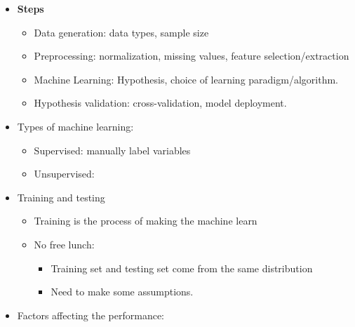\documentclass[
]{book}
\providecommand{\tightlist}{%
  \setlength{\itemsep}{0pt}\setlength{\parskip}{0pt}}
\begin{document}
\begin{itemize}
  \begin{itemize}
  \tightlist
  \item
    Retail: Market basket analysis, customer relationship management (CRM)
  \item
    Finance: Credit scoring, fraud detection.
  \item
    Manufacturing: Optimization, troubleshooting
  \item
    Medicine: medical diagnosis
  \item
    Telecommunications: Quality of service optimization, routing
  \item
    Bioinformatics: Motifs, alignment WEb mining, search engines.
  \end{itemize}
\item
  \textbf{Steps}

  \begin{itemize}
  \tightlist
  \item
    Data generation: data types, sample size
  \item
    Preprocessing: normalization, missing values, feature selection/extraction
  \item
    Machine Learning: Hypothesis, choice of learning paradigm/algorithm.
  \item
    Hypothesis validation: cross-validation, model deployment.
  \end{itemize}
\item
  Types of machine learning:

  \begin{itemize}
  \tightlist
  \item
    Supervised: manually label variables
  \item
    Unsupervised:
  \end{itemize}
\item
  Training and testing

  \begin{itemize}
  \item
    Training is the process of making the machine learn
  \item
    No free lunch:

    \begin{itemize}
    \tightlist
    \item
      Training set and testing set come from the same distribution
    \item
      Need to make some assumptions.
    \end{itemize}
  \end{itemize}
\item
  Factors affecting the performance:


\end{itemize}
\end{document}
